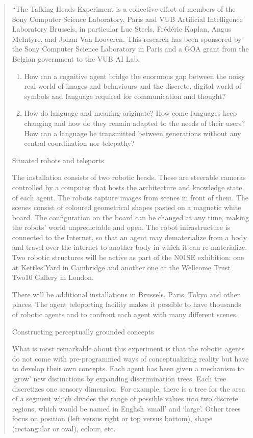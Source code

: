 \begin{quotation}
``The Talking Heads Experiment is a collective effort of members of the Sony Computer Science Laboratory, Paris
and VUB Artificial Intelligence Laboratory Brussels, in particular Luc Steels, Fr\'{e}d\'{e}ric Kaplan, Angus McIntyre, 
and Johan Van Looveren. This research has been sponsored by the Sony Computer Science Laboratory in Paris and a 
GOA grant from the Belgian government to the VUB AI Lab. 

\begin{enumerate}
\item How can a cognitive agent bridge the enormous gap between the noisy real world of images and behaviours and 
the discrete, digital world of symbols and language required for communication and thought? 
\item How do language and meaning originate? How come languages keep changing and how do they remain adapted to 
the needs of their users? How can a language be transmitted between generations without any central coordination 
nor telepathy?
\end{enumerate}

\noindent
{\bfshape Situated robots and teleports}

\noindent
The installation consists of two robotic heads. These are steerable cameras controlled by a computer that hosts the 
architecture and knowledge state of each agent. The robots capture images from scenes in front of them. The scenes consist 
of coloured geometrical shapes pasted on a magnetic white board. The configuration on the board can be changed at any 
time, making the robots' world unpredictable and open. The robot infrastructure is connected to the Internet, so 
that an agent may dematerialize from a body and travel over the internet to another body in which it can re-materialize.
Two robotic structures will be active as part of the N01SE exhibition: one at Kettles'Yard in Cambridge and another 
one at the Wellcome Trust Two10 Gallery in London. 

There will be additional installations in Brussels, Paris, Tokyo and other places. The agent teleporting facility 
makes it possible to have thousands of robotic agents and to confront each agent with many different scenes. 

\noindent
{\bfshape Constructing perceptually grounded concepts}

\noindent
What is most remarkable about this experiment is that the robotic agents do not come with 
pre-programmed ways of conceptualizing reality but have to develop their own concepts. Each agent has been 
given a mechanism to `grow' new distinctions by expanding discrimination trees. Each tree discretizes one sensory 
dimension. For example, there is a tree for the area of a segment which divides the range of possible values
into two discrete regions, which would be named in English `small' and `large'. Other trees focus on position 
(left versus right or top versus bottom), shape (rectangular or oval), colour, etc. 


\end{quotation}
